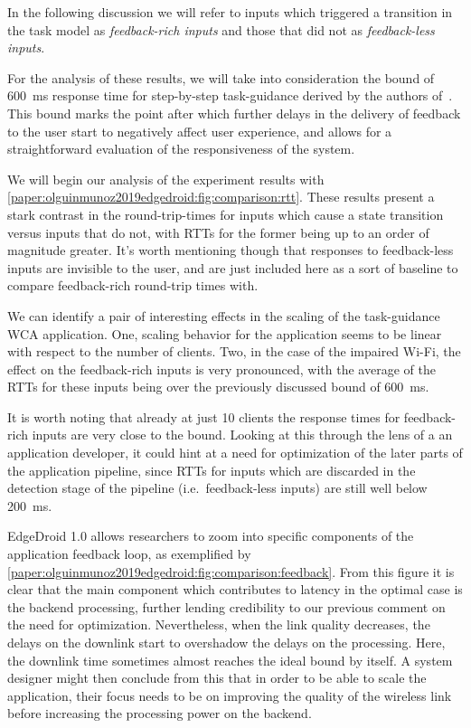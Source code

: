 In the following discussion we will refer to inputs which triggered a transition in the task model as \emph{feedback-rich inputs} and those that did not as \emph{feedback-less inputs}.

For the analysis of these results, we will take into consideration the bound of \SI{600}{\milli\second} response time for step-by-step task-guidance derived by the authors of~\cite{chen2017empirical}.
This bound marks the point after which further delays in the delivery of feedback to the user start to negatively affect user experience, and allows for a straightforward evaluation of the responsiveness of the system.

We will begin our analysis of the experiment results with \cref{paper:olguinmunoz2019edgedroid:fig:comparison:rtt}.
These results present a stark contrast in the round-trip-times for inputs which cause a state transition versus inputs that do not, with RTTs for the former being up to an order of magnitude greater.
It's worth mentioning though that responses to feedback-less inputs are invisible to the user, and are just included here as a sort of baseline to compare feedback-rich round-trip times with.

We can identify a pair of interesting effects in the scaling of the task-guidance \gls{WCA} application.
One, scaling behavior for the application seems to be linear with respect to the number of clients.
Two, in the case of the impaired Wi-Fi, the effect on the feedback-rich inputs is very pronounced, with the average of the RTTs for these inputs being over the previously discussed bound of \SI{600}{\milli\second}.

It is worth noting that already at just 10 clients the response times for feedback-rich inputs are very close to the bound.
Looking at this through the lens of a an application developer, it could hint at a need for optimization of the later parts of the application pipeline, since RTTs for inputs which are discarded in the detection stage of the pipeline (i.e.\ feedback-less inputs) are still well below \SI{200}{\milli\second}.

EdgeDroid 1.0 allows researchers to zoom into specific components of the application feedback loop, as exemplified by \cref{paper:olguinmunoz2019edgedroid:fig:comparison:feedback}.
From this figure it is clear that the main component which contributes to latency in the optimal case is the backend processing, further lending credibility to our previous comment on the need for optimization.
Nevertheless, when the link quality decreases, the delays on the downlink start to overshadow the delays on the processing.
Here, the downlink time sometimes almost reaches the ideal bound by itself.
A system designer might then conclude from this that in order to be able to scale the application, their focus needs to be on improving the quality of the wireless link before increasing the processing power on the backend.

